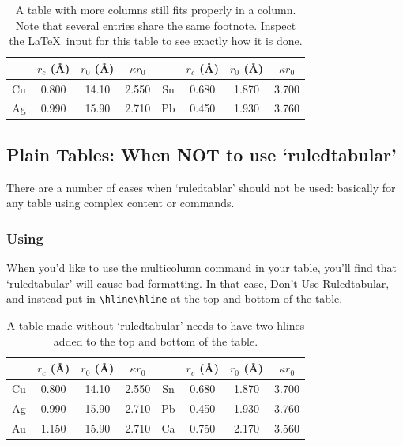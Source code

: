 \documentclass[preprint]{JASA}
\begin{document}
\begin{table}[h!]
\caption{\label{tab:table1}A table with more columns still fits
properly in a column. Note that several entries share the same
footnote. Inspect the \LaTeX\ input for this table to see
exactly how it is done.}

\begin{ruledtabular}
\begin{tabular}{cccccccc}
 &$r_c$ (\AA)\footnotemark[1]&$r_0$ (\AA)&$\kappa r_0$&
 &$r_c$ (\AA) &$r_0$ (\AA)&$\kappa r_0$\\
\hline
Cu& 0.800 & 14.10 & 2.550 &Sn\footnotemark[1]
& 0.680 & 1.870 & 3.700 \\
Ag& 0.990 & 15.90 & 2.710 &Pb\footnotemark[2]
& 0.450 & 1.930 & 3.760 \\
\end{tabular}
\end{ruledtabular}
\end{table}


\subsection{Plain Tables: When NOT to use `ruledtabular'}
There are a number of cases when `ruledtablar' should not
be used: basically for any table using complex content or 
commands.



\subsubsection{Using {\tt\string\multicolumn}}
When you'd like to use the multicolumn command in your
table, you'll find that `ruledtabular' will cause bad
formatting. In that case, Don't Use Ruledtabular, and
instead put in \verb+\hline\hline+ at the top and bottom of
the table. 


\begin{table}[ht]
\caption{A table made without `ruledtabular' needs to have two hlines
added to the top and bottom of the table.}
\vskip3pt
\begin{tabular}{cccccccc}
\hline\hline
 &$r_c$ (\AA)\footnotemark[1]&$r_0$ (\AA)&$\kappa r_0$&
 &$r_c$ (\AA) &$r_0$ (\AA)&$\kappa r_0$\\
\hline
Cu& 0.800 & 14.10 & 2.550 &Sn\footnotemark[1]
& 0.680 & 1.870 & 3.700 \\
Ag& 0.990 & 15.90 & 2.710 &Pb\footnotemark[2]
& 0.450 & 1.930 & 3.760 \\
Au& 1.150 & 15.90 & 2.710 &Ca\footnotemark[3]
& 0.750 & 2.170 & 3.560\\
\hline\hline
\end{tabular}
\end{table}
\end{document}
